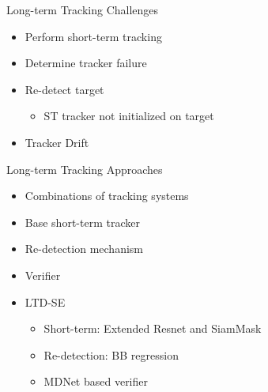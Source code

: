 \documentclass[mathserif, 14pt, xcolor=svgnames]{beamer}
\begin{document}
\bgroup
\begin{frame}{Long-term Tracking Challenges}
    \begin{itemize}
      \setlength\itemsep{1.5em}
       \item \hspace{0pt}
         \pause Perform short-term tracking 
       \item \hspace{0pt}
         \pause Determine tracker failure
       \item \hspace{0pt}
          \pause Re-detect target
          \begin{itemize}
            \setlength\itemsep{1.5em}
             \item \hspace{0pt}
               \pause
                ST tracker not initialized on target
          \end{itemize}
       \item \hspace{0pt}
          \pause Tracker Drift
    \end{itemize}
\end{frame}
\egroup

\bgroup
\begin{frame}{Long-term Tracking Approaches}
  \begin{itemize}
      \setlength\itemsep{1.3em}
      \setlength\itemindent{0em}
       \item \hspace{0pt}
         Combinations of tracking systems
       \item \hspace{0pt}
         Base short-term tracker
       \item \hspace{0pt}
         Re-detection mechanism
       \item \hspace{0pt}
         Verifier
       \item \hspace{0pt}
         LTD-SE 
          \begin{itemize}
            \setlength\itemindent{-0.5em}
             \item \hspace{0pt}
               Short-term: Extended Resnet and SiamMask
             \item \hspace{0pt}
               Re-detection: BB regression \citep{girshick2014}
             \item \hspace{0pt}
               MDNet based verifier
           \end{itemize}
    \end{itemize}
\end{frame}
\egroup
\end{document}
